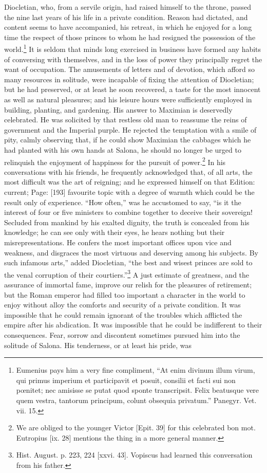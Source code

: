 Diocletian, who, from a servile origin, had raised himself to the throne, passed the nine last years of his life in a private condition. Reason had dictated, and content seems to have accompanied, his retreat, in which he enjoyed for a long time the respect of those princes to whom he had resigned the possession of the world.\footnote{Eumenius pays him a very fine compliment, \texthebrew{“}At enim divinum illum virum, qui primus imperium et participavit et posuit, consilii et facti sui non pœnitet; nec amisisse se putat quod sponte transcripsit. Felix beatusque vere quem vestra, tantorum principum, colunt obsequia privatum.\texthebrew{}” Panegyr. Vet. vii. 15.} It is seldom that minds long exercised in business have formed any habits of conversing with themselves, and in the loss of power they principally regret the want of occupation. The amusements of letters and of devotion, which afford so many resources in solitude, were incapable of fixing the attention of Diocletian; but he had preserved, or at least he soon recovered, a taste for the most innocent as well as natural pleasures; and his leisure hours were sufficiently employed in building, planting, and gardening. His answer to Maximian is deservedly celebrated. He was solicited by that restless old man to reassume the reins of government and the Imperial purple. He rejected the temptation with a smile of pity, calmly observing that, if he could show Maximian the cabbages which he had planted with his own hands at Salona, he should no longer be urged to relinquish the enjoyment of happiness for the pursuit of power.\footnote{We are obliged to the younger Victor [Epit. 39] for this celebrated bon mot. Eutropius [ix. 28] mentions the thing in a more general manner.} In his conversations with his friends, he frequently acknowledged that, of all arts, the most difficult was the art of reigning; and he expressed himself on that Edition: current; Page: [193] favourite topic with a degree of warmth which could be the result only of experience. \texthebrew{“}How often,\texthebrew{}” was he accustomed to say, \texthebrew{“}is it the interest of four or five ministers to combine together to deceive their sovereign! Secluded from mankind by his exalted dignity, the truth is concealed from his knowledge; he can see only with their eyes, he hears nothing but their misrepresentations. He confers the most important offices upon vice and weakness, and disgraces the most virtuous and deserving among his subjects. By such infamous arts,\texthebrew{}” added Diocletian, \texthebrew{“}the best and wisest princes are sold to the venal corruption of their courtiers.\texthebrew{}”\footnote{Hist. August. p. 223, 224 [xxvi. 43]. Vopiscus had learned this conversation from his father.} A just estimate of greatness, and the assurance of immortal fame, improve our relish for the pleasures of retirement; but the Roman emperor had filled too important a character in the world to enjoy without alloy the comforts and security of a private condition. It was impossible that he could remain ignorant of the troubles which afflicted the empire after his abdication. It was impossible that he could be indifferent to their consequences. Fear, sorrow and discontent sometimes pursued him into the solitude of Salona. His tenderness, or at least his pride, was 